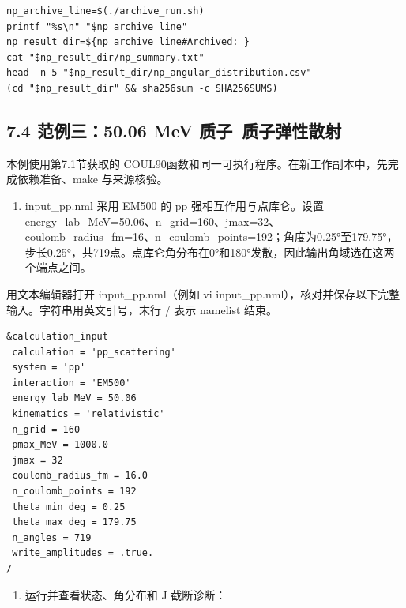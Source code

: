 \documentclass[UTF8,a4paper,zihao=5,fontset=fandol]{ctexart}
\begin{document}
\begin{Verbatim}[samepage=true,breaklines=true,breakanywhere=true,fontsize=\small,frame=leftline,framesep=3mm,rulecolor=\color{bluegray}]
np_archive_line=$(./archive_run.sh)
printf "%s\n" "$np_archive_line"
np_result_dir=${np_archive_line#Archived: }
cat "$np_result_dir/np_summary.txt"
head -n 5 "$np_result_dir/np_angular_distribution.csv"
(cd "$np_result_dir" && sha256sum -c SHA256SUMS)
\end{Verbatim}
\subsection*{7.4 范例三：50.06 MeV 质子–质子弹性散射}
本例使用第7.1节获取的 COUL90函数和同一可执行程序。在新工作副本中，先完成依赖准备、{\ttfamily\small make} 与来源核验。

\begin{enumerate}[start=1]
\item {\ttfamily\small input\_\allowbreak{}pp.\allowbreak{}nml} 采用 EM500 的 pp 强相互作用与点库仑。设置 {\ttfamily\small energy\_\allowbreak{}lab\_\allowbreak{}MeV=\allowbreak{}50.\allowbreak{}06}、{\ttfamily\small n\_\allowbreak{}grid=\allowbreak{}160}、{\ttfamily\small jmax=\allowbreak{}32}、{\ttfamily\small coulomb\_\allowbreak{}radius\_\allowbreak{}fm=\allowbreak{}16}、{\ttfamily\small n\_\allowbreak{}coulomb\_\allowbreak{}points=\allowbreak{}192}；角度为0.25°至179.75°，步长0.25°，共719点。点库仑角分布在0°和180°发散，因此输出角域选在这两个端点之间。


\end{enumerate}
用文本编辑器打开 {\ttfamily\small input\_\allowbreak{}pp.\allowbreak{}nml}（例如 {\ttfamily\small vi input\_\allowbreak{}pp.\allowbreak{}nml}），核对并保存以下完整输入。字符串用英文引号，末行 {\ttfamily\small /\allowbreak{}} 表示 namelist 结束。


\begin{Verbatim}[samepage=true,breaklines=true,breakanywhere=true,fontsize=\small,frame=leftline,framesep=3mm,rulecolor=\color{bluegray}]
&calculation_input
 calculation = 'pp_scattering'
 system = 'pp'
 interaction = 'EM500'
 energy_lab_MeV = 50.06
 kinematics = 'relativistic'
 n_grid = 160
 pmax_MeV = 1000.0
 jmax = 32
 coulomb_radius_fm = 16.0
 n_coulomb_points = 192
 theta_min_deg = 0.25
 theta_max_deg = 179.75
 n_angles = 719
 write_amplitudes = .true.
/
\end{Verbatim}
\begin{enumerate}[start=2]
\item 运行并查看状态、角分布和 J 截断诊断：


\end{enumerate}
\end{document}
